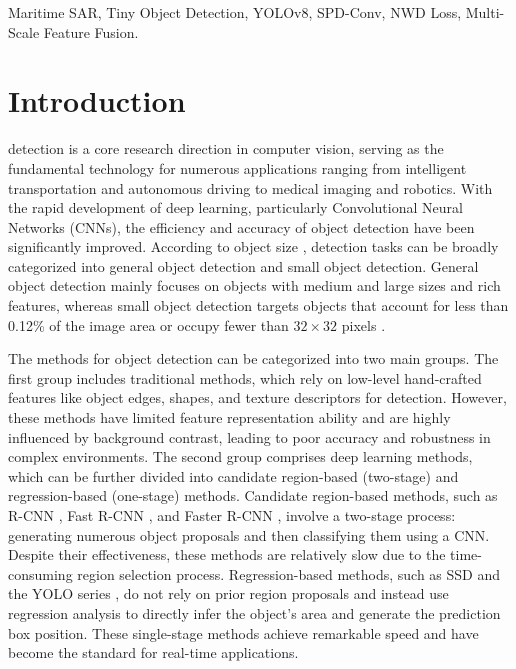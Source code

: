 \documentclass[lettersize,journal]{IEEEtran}
\begin{document}
\begin{IEEEkeywords}
Maritime SAR, Tiny Object Detection, YOLOv8, SPD-Conv, NWD Loss, Multi-Scale Feature Fusion.
\end{IEEEkeywords}

\section{Introduction}
 detection is a core research direction in computer vision, serving as the fundamental technology for numerous applications ranging from intelligent transportation \cite{ref1} and autonomous driving \cite{ref2} to medical imaging \cite{ref3} and robotics. With the rapid development of deep learning, particularly Convolutional Neural Networks (CNNs), the efficiency and accuracy of object detection have been significantly improved. According to object size \cite{ref4}, detection tasks can be broadly categorized into general object detection and small object detection. General object detection mainly focuses on objects with medium and large sizes and rich features, whereas small object detection targets objects that account for less than 0.12\% of the image area or occupy fewer than $32 \times 32$ pixels \cite{ref5}.

The methods for object detection can be categorized into two main groups. The first group includes traditional methods, which rely on low-level hand-crafted features like object edges, shapes, and texture descriptors for detection. However, these methods have limited feature representation ability and are highly influenced by background contrast, leading to poor accuracy and robustness in complex environments. The second group comprises deep learning methods, which can be further divided into candidate region-based (two-stage) and regression-based (one-stage) methods. Candidate region-based methods, such as R-CNN \cite{ref6}, Fast R-CNN \cite{ref7}, and Faster R-CNN \cite{ref8}, involve a two-stage process: generating numerous object proposals and then classifying them using a CNN. Despite their effectiveness, these methods are relatively slow due to the time-consuming region selection process. Regression-based methods, such as SSD \cite{ref9} and the YOLO series \cite{b1, ref10}, do not rely on prior region proposals and instead use regression analysis to directly infer the object's area and generate the prediction box position. These single-stage methods achieve remarkable speed and have become the standard for real-time applications.
\end{document}

